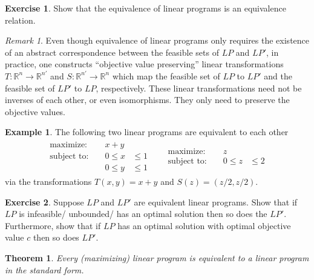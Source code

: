 \documentclass[
]{book}
\newtheorem{theorem}{Theorem}[chapter]
\theoremstyle{definition}
\theoremstyle{definition}
\newtheorem{example}{Example}[chapter]
\theoremstyle{definition}
\newtheorem{exercise}{Exercise}[chapter]
\theoremstyle{definition}
\theoremstyle{remark}
\newtheorem*{remark}{Remark}
\begin{document}
\begin{exercise}
Show that the equivalence of linear programs is an equivalence relation.
\end{exercise}

\begin{remark}
Even though equivalence of linear programs only requires the existence of an abstract correspondence between the feasible sets of \(LP\) and \(LP'\), in practice, one constructs ``objective value preserving'' linear transformations \(T: \mathbb{R}^n \to \mathbb{R}^{n'}\) and \(S: \mathbb{R}^{n'} \to \mathbb{R}^{n}\) which map the feasible set of \(LP\) to \(LP'\) and the feasible set of \(LP'\) to \(LP\), respectively. These linear transformations need not be inverses of each other, or even isomorphisms. They only need to preserve the objective values.
\end{remark}

\begin{example}
The following two linear programs are equivalent to each other
\begin{align*}
\begin{aligned}
  \mbox{maximize: } && x + y & \\
  \mbox{subject to: } && 0 \le x &\le 1 \\
     && 0 \le y &\le 1 
\end{aligned}
&&
\begin{aligned}
  \mbox{maximize: } && z & \\
  \mbox{subject to: } && 0 \le z &\le 2
\end{aligned}
\end{align*}
via the transformations \(T(x, y) = x + y\) and \(S(z) = (z/2, z/2)\).
\end{example}

\begin{exercise}
Suppose \(LP\) and \(LP'\) are equivalent linear programs. Show that if \(LP\) is infeasible/ unbounded/
has an optimal solution then so does the \(LP'\). Furthermore, show that if \(LP\) has an optimal
solution with optimal objective value \(c\) then so does \(LP'\).
\end{exercise}

\begin{theorem}
\protect\hypertarget{thm:lp-to-standard-form}{}\label{thm:lp-to-standard-form}Every (maximizing) linear program is equivalent to a linear program in the standard form.
\end{theorem}
\end{document}
